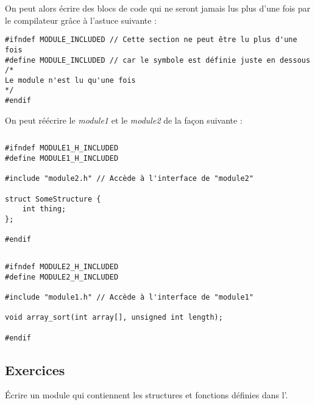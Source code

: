 \documentclass[../../../main.tex]{subfiles}
\begin{document}
On peut alors écrire des blocs de code qui ne seront jamais lus plus d'une fois par le compilateur grâce à l'astuce suivante :
\begin{verbatim}
#ifndef MODULE_INCLUDED // Cette section ne peut être lu plus d'une fois
#define MODULE_INCLUDED // car le symbole est définie juste en dessous
/*
Le module n'est lu qu'une fois
*/
#endif
\end{verbatim}
On peut réécrire le \textit{module1} et le \textit{module2} de la façon suivante :
\begin{lstlisting}[title=module1.h]
\end{lstlisting}
\begin{verbatim}
#ifndef MODULE1_H_INCLUDED
#define MODULE1_H_INCLUDED

#include "module2.h" // Accède à l'interface de "module2"

struct SomeStructure {
	int thing;
};

#endif
\end{verbatim}
\begin{lstlisting}[title=module2.h]
\end{lstlisting}
\begin{verbatim}
#ifndef MODULE2_H_INCLUDED
#define MODULE2_H_INCLUDED

#include "module1.h" // Accède à l'interface de "module1"

void array_sort(int array[], unsigned int length);

#endif
\end{verbatim}
\subsection{Exercices}
 Écrire un module qui contiennent les structures et fonctions définies dans l'.
\end{document}
